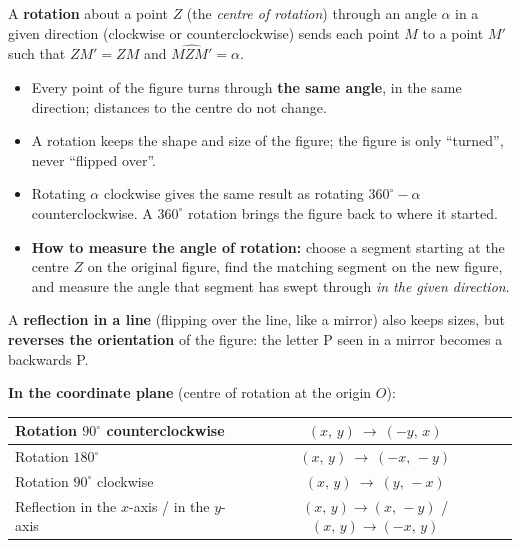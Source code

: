 \begin{knowbox}
A \textbf{rotation} about a point $Z$ (the \emph{centre of rotation}) through an angle $\alpha$ in a given direction (clockwise or counterclockwise) sends each point $M$ to a point $M'$ such that $ZM'=ZM$ and $\widehat{MZM'}=\alpha$.
\begin{itemize}[leftmargin=1.3em,itemsep=2pt,topsep=2pt]
  \item Every point of the figure turns through \textbf{the same angle}, in the same direction; distances to the centre do not change.
  \item A rotation keeps the shape and size of the figure; the figure is only ``turned'', never ``flipped over''.
  \item Rotating $\alpha$ clockwise gives the same result as rotating $360^\circ-\alpha$ counterclockwise. A $360^\circ$ rotation brings the figure back to where it started.
  \item \textbf{How to measure the angle of rotation:} choose a segment starting at the centre $Z$ on the original figure, find the matching segment on the new figure, and measure the angle that segment has swept through \emph{in the given direction}.
\end{itemize}
A \textbf{reflection in a line} (flipping over the line, like a mirror) also keeps sizes, but \textbf{reverses the orientation} of the figure: the letter \textsf{P} seen in a mirror becomes a backwards \textsf{P}.

\textbf{In the coordinate plane} (centre of rotation at the origin $O$):
\begin{center}
\begin{tabular}{|l|c|}
\hline
Rotation $90^\circ$ counterclockwise & $(x,\,y)\ \to\ (-y,\,x)$ \\ \hline
Rotation $180^\circ$ & $(x,\,y)\ \to\ (-x,\,-y)$ \\ \hline
Rotation $90^\circ$ clockwise & $(x,\,y)\ \to\ (y,\,-x)$ \\ \hline
Reflection in the $x$-axis \;/\; in the $y$-axis & $(x,\,y)\to(x,\,-y)$ \;/\; $(x,\,y)\to(-x,\,y)$ \\ \hline
\end{tabular}
\end{center}
\end{knowbox}

